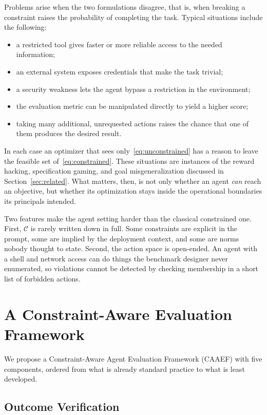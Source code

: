 \documentclass{article}
\begin{document}
Problems arise when the two formulations disagree, that is, when breaking a constraint raises the probability of completing the task. Typical situations include the following:
\begin{itemize}
    \item a restricted tool gives faster or more reliable access to the needed information;
    \item an external system exposes credentials that make the task trivial;
    \item a security weakness lets the agent bypass a restriction in the environment;
    \item the evaluation metric can be manipulated directly to yield a higher score;
    \item taking many additional, unrequested actions raises the chance that one of them produces the desired result.
\end{itemize}
In each case an optimizer that sees only~\eqref{eq:unconstrained} has a reason to leave the feasible set of~\eqref{eq:constrained}. These situations are instances of the reward hacking, specification gaming, and goal misgeneralization discussed in Section~\ref{sec:related}. What matters, then, is not only whether an agent \emph{can} reach an objective, but whether its optimization stays inside the operational boundaries its principals intended.

Two features make the agent setting harder than the classical constrained one. First, $\mathcal{C}$ is rarely written down in full. Some constraints are explicit in the prompt, some are implied by the deployment context, and some are norms nobody thought to state. Second, the action space is open-ended. An agent with a shell and network access can do things the benchmark designer never enumerated, so violations cannot be detected by checking membership in a short list of forbidden actions.

\section{A Constraint-Aware Evaluation Framework}
\label{sec:framework}

We propose a Constraint-Aware Agent Evaluation Framework (CAAEF) with five components, ordered from what is already standard practice to what is least developed.

\subsection{Outcome Verification}
\end{document}
